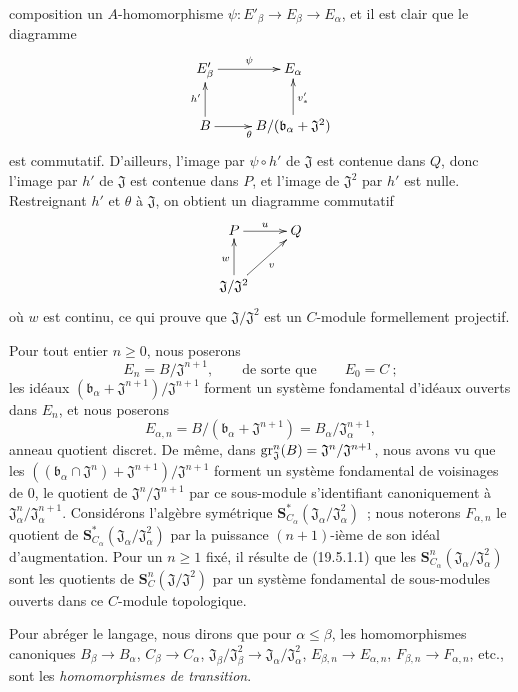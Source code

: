 \begin{env}[19.5.6.1]
composition un $A$-homomorphisme $\psi:E'_\beta\to E_\beta\to E_\alpha$, et
il est clair que le diagramme
\[
  \xymatrix{
    E'_\beta \ar[r]^{\psi} & E_\alpha \\
    B \ar[u]^{h'} \ar[r]_{\theta} &
    B/(\mathfrak b_\alpha+\mathfrak J^2) \ar[u]_{v'_*}
  }
\]
est commutatif. D'ailleurs, l'image par $\psi\circ h'$ de $\mathfrak J$ est
contenue dans $Q$, donc l'image par $h'$ de $\mathfrak J$ est contenue dans
$P$, et l'image de $\mathfrak J^2$ par $h'$ est nulle. Restreignant $h'$ et
$\theta$ à $\mathfrak J$, on obtient un diagramme commutatif
\[
  \xymatrix{
    P \ar[r]^{u} & Q \\
    \mathfrak J/\mathfrak J^2 \ar[u]^{w} \ar[ur]_{v}
  }
\]
où $w$ est continu, ce qui prouve que
$\mathfrak J/\mathfrak J^2$ est un $C$-module formellement projectif.
\end{env}


\begin{env}[19.5.6.2]
\label{0.19.5.6.2-fr}
Pour tout entier $n\geq0$, nous poserons
\[
  E_n=B/\mathfrak J^{n+1},
  \qquad\text{de sorte que}\qquad E_0=C~;
\]
les idéaux $(\mathfrak b_\alpha+\mathfrak J^{n+1})/\mathfrak J^{n+1}$ forment
un système fondamental d'idéaux ouverts dans $E_n$, et nous poserons
\[
  E_{\alpha,n}=B/(\mathfrak b_\alpha+\mathfrak J^{n+1})
  =B_\alpha/\mathfrak J_\alpha^{n+1},
\]
anneau quotient discret. De même, dans
$\operatorname{gr}_{\mathfrak J}^n(B)=\mathfrak J^n/\mathfrak J^{n+1}$, nous avons vu que les
$((\mathfrak b_\alpha\cap\mathfrak J^n)+\mathfrak J^{n+1})/
\mathfrak J^{n+1}$ forment un système fondamental de voisinages de $0$, le
quotient de $\mathfrak J^n/\mathfrak J^{n+1}$ par ce sous-module s'identifiant
canoniquement à $\mathfrak J_\alpha^n/\mathfrak J_\alpha^{n+1}$. Considérons
l'algèbre symétrique
$\mathbf S_{C_\alpha}^*(\mathfrak J_\alpha/\mathfrak J_\alpha^2)$~; nous
noterons $F_{\alpha,n}$ le quotient de
$\mathbf S_{C_\alpha}^*(\mathfrak J_\alpha/\mathfrak J_\alpha^2)$ par la
puissance $(n+1)$-ième de son idéal d'augmentation. Pour un $n\geq1$ fixé, il
résulte de (19.5.1.1) que les
$\mathbf S_{C_\alpha}^n(\mathfrak J_\alpha/\mathfrak J_\alpha^2)$ sont les
quotients de $\mathbf S_C^n(\mathfrak J/\mathfrak J^2)$ par un système
fondamental de sous-modules ouverts dans ce $C$-module topologique.

Pour abréger le langage, nous dirons que pour $\alpha\leq\beta$, les
homomorphismes canoniques $B_\beta\to B_\alpha$, $C_\beta\to C_\alpha$,
$\mathfrak J_\beta/\mathfrak J_\beta^2\to
\mathfrak J_\alpha/\mathfrak J_\alpha^2$, $E_{\beta,n}\to E_{\alpha,n}$,
$F_{\beta,n}\to F_{\alpha,n}$, etc., sont les \emph{homomorphismes de
transition}.
\end{env}

